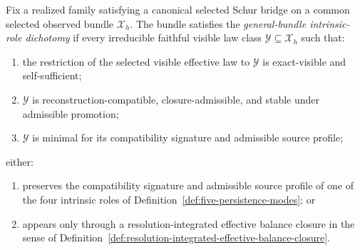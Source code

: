 \begin{definition}
\label{def:general-bundle-intrinsic-role-dichotomy}
Fix a realized family satisfying a canonical selected Schur bridge on a common
selected observed bundle \(\mathcal X_h\). The bundle satisfies the
\emph{general-bundle intrinsic-role dichotomy} if every irreducible faithful
visible law class \(\mathcal Y\subseteq \mathcal X_h\) such that:
\begin{enumerate}[label=(\roman*), leftmargin=2em, itemsep=0.2em]
\item the restriction of the selected visible effective law to \(\mathcal Y\)
      is exact-visible and self-sufficient;
\item \(\mathcal Y\) is reconstruction-compatible, closure-admissible, and
      stable under admissible promotion;
\item \(\mathcal Y\) is minimal for its compatibility signature and admissible
      source profile;
\end{enumerate}
either:
\begin{enumerate}[label=(\alph*), leftmargin=2em, itemsep=0.2em]
\item preserves the compatibility signature and admissible source profile of
      one of the four intrinsic roles of
      Definition~\ref{def:five-persistence-modes}; or
\item appears only through a resolution-integrated effective balance closure in
      the sense of
      Definition~\ref{def:resolution-integrated-effective-balance-closure}.
\end{enumerate}
\end{definition}


